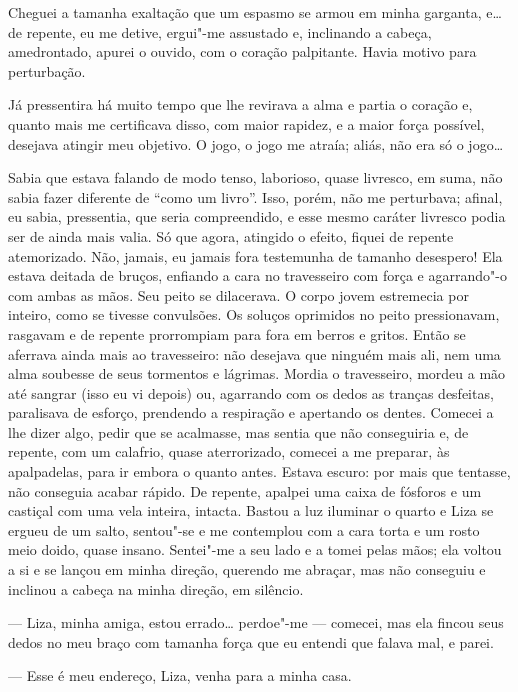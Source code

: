 Cheguei a tamanha exaltação que um espasmo se armou em minha garganta,
e\ldots{} de repente, eu me detive, ergui"-me assustado e, inclinando a
cabeça, amedrontado, apurei o ouvido, com o coração palpitante. Havia
motivo para perturbação.

Já pressentira há muito tempo que lhe revirava a alma e partia o coração
e, quanto mais me certificava disso, com maior rapidez, e a maior força
possível, desejava atingir meu objetivo. O jogo, o jogo me atraía;
aliás, não era só o jogo\ldots{}

Sabia que estava falando de modo tenso, laborioso, quase livresco, em
suma, não sabia fazer diferente de ``como um livro''. Isso, porém, não
me perturbava; afinal, eu sabia, pressentia, que seria compreendido, e
esse mesmo caráter livresco podia ser de ainda mais valia. Só que agora,
atingido o efeito, fiquei de repente atemorizado. Não, jamais, eu jamais
fora testemunha de tamanho desespero! Ela estava deitada de bruços,
enfiando a cara no travesseiro com força e agarrando"-o com ambas as
mãos. Seu peito se dilacerava. O corpo jovem estremecia por inteiro,
como se tivesse convulsões. Os soluços oprimidos no peito pressionavam,
rasgavam e de repente prorrompiam para fora em berros e gritos. Então se
aferrava ainda mais ao travesseiro: não desejava que ninguém mais ali,
nem uma alma soubesse de seus tormentos e lágrimas. Mordia o
travesseiro, mordeu a mão até sangrar (isso eu vi depois) ou, agarrando
com os dedos as tranças desfeitas, paralisava de esforço, prendendo a
respiração e apertando os dentes. Comecei a lhe dizer algo, pedir que se
acalmasse, mas sentia que não conseguiria e, de repente, com um
calafrio, quase aterrorizado, comecei a me preparar, às apalpadelas,
para ir embora o quanto antes. Estava escuro: por mais que tentasse, não
conseguia acabar rápido. De repente, apalpei uma caixa de fósforos e um
castiçal com uma vela inteira, intacta. Bastou a luz iluminar o quarto e
Liza se ergueu de um salto, sentou"-se e me contemplou com a cara torta e
um rosto meio doido, quase insano. Sentei"-me a seu lado e a tomei pelas
mãos; ela voltou a si e se lançou em minha direção, querendo me abraçar,
mas não conseguiu e inclinou a cabeça na minha direção, em silêncio.

--- Liza, minha amiga, estou errado\ldots{} perdoe"-me --- comecei, mas ela
fincou seus dedos no meu braço com tamanha força que eu entendi que
falava mal, e parei.

--- Esse é meu endereço, Liza, venha para a minha casa.

